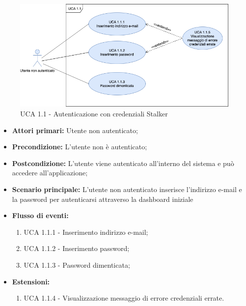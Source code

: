 \begin{figure}[h]

  \centering
    \includegraphics[scale=0.4]{sezioni/UseCase/Immagini/Login.png}
  \caption{UCA 1.1 - Autenticazione con credenziali Stalker}
\end{figure}

\begin{itemize}
\item \textbf{Attori primari:} Utente non autenticato;
\item \textbf{Precondizione:} L'utente non è autenticato;
\item \textbf{Postcondizione:} L'utente viene autenticato all'interno del sistema e può accedere all'applicazione;
\item \textbf{Scenario principale:} L'utente non autenticato inserisce l'indirizzo e-mail e la password per autenticarsi attraverso la dashboard iniziale%
\item \textbf{Flusso di eventi:} %
  \begin{enumerate}
        \item UCA 1.1.1 - Inserimento indirizzo e-mail;
        \item UCA 1.1.2 - Inserimento password;
        \item UCA 1.1.3 - Password dimenticata;
    \end{enumerate}
\item \textbf{Estensioni:}
	\begin{enumerate}
		\item UCA 1.1.4 - Visualizzazione messaggio di errore credenziali errate.
	\end{enumerate}
\end{itemize}

